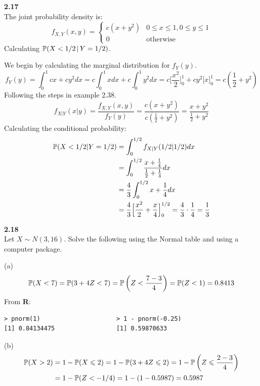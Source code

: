 \newpage\noindent
\textbf{2.17}\\  %
The joint probability density is:
$$
f_{X,Y}(x,y) = 
\left\{
    \begin{matrix}
        c(x + y^2) & 0\leq x\leq 1, 0\leq y\leq 1 \\
        0 & \text{otherwise}
    \end{matrix}
\right.
$$
Calculating $\P(X < 1/2 \,|\, Y = 1/2)$.

\medskip\noindent
We begin by calculating the marginal distribution for $f_Y(y)$.
$$
f_Y(y) = \int_0^1 cx + cy^2 dx = c\int_0^1 x dx + c\int_0^1 y^2 dx =
c\big[ \frac{x^2}{2}\big]_0^1 + cy^2\big[x\big]_0^1 = c\left(\frac{1}{2} + y^2\right)
$$
Following the steps in example 2.38.
$$
f_{X|Y}(x|y) = \frac{f_{X,Y}(x,y)}{f_Y(y)} = \frac{c(x + y^2)}{c\left(\frac{1}{2} + y^2\right)}
= \frac{x + y^2}{\frac{1}{2} + y^2}
$$
Calculating the conditional probability:
\begin{align*}
    \P(X < 1/2 | Y = 1/2) &= \int_0^{1/2} f_{X|Y}(1/2|1/2)dx \\
    &= \int_0^{1/2} \frac{x + \frac{1}{4}}{\frac{1}{2} + \frac{1}{4}} dx \\
    &= \frac{4}{3} \int_0^{1/2}x + \frac{1}{4}dx \\
    &= \frac{4}{3} \Big[\frac{x^2}{2} + \frac{x}{4}\Big]_0^{1/2} = \frac{4}{3}\cdot\frac{1}{4} = \frac{1}{3}
\end{align*}

\bigskip\noindent
\textbf{2.18}\\  %
Let $X \sim N(3, 16)$. Solve the following using the Normal table and using
a computer package.

\medskip\noindent(a)
$$
\P(X < 7) = \P(3 + 4Z < 7) = \P\left(Z < \frac{7 - 3}{4}\right) = \P(Z < 1) = 0.8413
$$
From \textbf{R}:
\begin{verbatim}
> pnorm(1)                     > 1 - pnorm(-0.25)
[1] 0.84134475                 [1] 0.59870633
\end{verbatim}

\medskip\noindent(b)
\begin{align*}
    \P(X > 2) &= 1 - \P(X \leq 2) = 1 - \P(3 + 4Z \leq 2) = 1 - \P\left(Z \leq \frac{2 - 3}{4}\right) \\
    &= 1 - \P(Z < -1/4) = 1 - (1 - 0.5987) = 0.5987
\end{align*}

